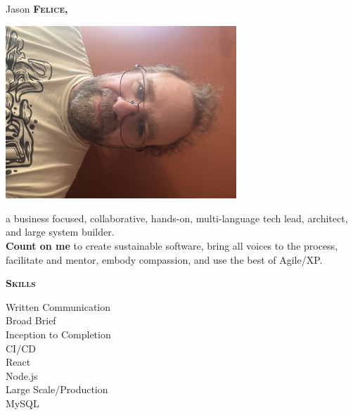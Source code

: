 \documentclass[11pt, letterpaper]{article}
\newcommand{\headleft}[1]{\vspace*{3ex}\textsc{\textbf{#1}}\par%
    \vspace*{-1.5ex}\hrulefill\par\vspace*{0.7ex}}
\newenvironment{skills}{%
  \headleft{Skills}
  \small
  \raggedleft
}{%
}
\newcommand{\skill}[1]{%
  #1\ \raisebox{-0.3ex}{\scalebox{1.75}{$\bullet$}}\\
}
\begin{document}
\setlength{\topskip}{0pt}
\setlength{\parindent}{0pt}
\setlength{\parskip}{0pt}
\setlength{\fboxsep}{0pt}
\pagestyle{empty}
\raggedbottom

\begin{minipage}[t]{0.33\textwidth} %
\colorbox{cvblue}{\begin{minipage}[t][5mm][t]{\textwidth}\null\hfill\null\end{minipage}}

\vspace{-.25ex} %
\colorbox{cvblue!90}{\color{white}  %
\textwidth\relax%
\begin{minipage}[t][\dimexpr\textheight-5mm\relax][t]{0.82\textwidth}
\raggedright
\vspace*{2.5ex}

\null\hfill\Huge{Jason \textbf{\textsc{Felice,}}}\normalsize\hfill\null

\null\hfill\includegraphics[width=0.65\textwidth]{profile.jpg}\hfill\null

\vspace*{0.5ex} %

{\small
a business focused, collaborative, hands-on, multi-language tech lead, architect, and large system builder. \\[2ex]

{\bf Count on me} to create sustainable software, bring all voices to the process, facilitate and mentor, embody compassion, and use the best of Agile/XP. \\
}


\begin{skills}
\skill{Written Communication}
\skill{Broad Brief}
\skill{Inception to Completion}
\skill{CI/CD}
\skill{React}
\skill{Node.js}
\skill{Large Scale/Production}
\skill{MySQL}
\end{skills}


\end{minipage}}
\end{minipage}
\end{document}
